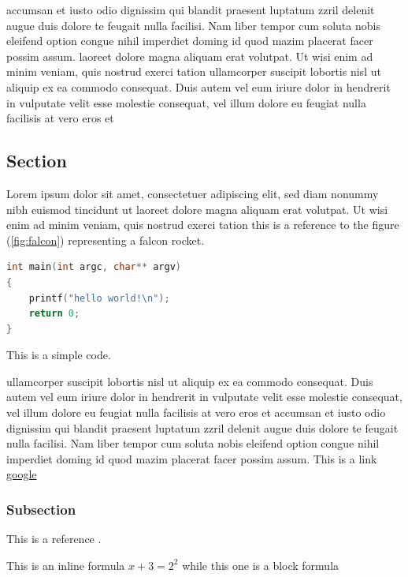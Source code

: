 \documentclass[a4paper, 10pt]{article}
\begin{document}
accumsan et iusto odio dignissim qui blandit praesent luptatum zzril delenit augue duis dolore te feugait nulla facilisi.
Nam liber tempor cum soluta nobis eleifend option congue nihil imperdiet doming id quod mazim placerat facer possim assum.
laoreet dolore magna aliquam erat volutpat. Ut wisi enim ad minim veniam, quis nostrud exerci tation
ullamcorper suscipit lobortis nisl ut aliquip ex ea commodo consequat. Duis autem vel eum iriure dolor in hendrerit in
vulputate velit esse molestie consequat, vel illum dolore eu feugiat nulla facilisis at vero eros et


\subsection{Section}

Lorem ipsum
dolor sit amet, consectetuer adipiscing elit, sed diam nonummy nibh euismod tincidunt ut
laoreet dolore magna aliquam erat volutpat. Ut wisi enim ad minim veniam, quis nostrud exerci tation this is a reference to the figure (\ref{fig:falcon}) representing a falcon rocket.

\begin{program}
\begin{center}

\begin{lstlisting}[language=c]
int main(int argc, char** argv)
{
    printf("hello world!\n");
    return 0;
}
\end{lstlisting}

\caption{This is a simple code.}
\end{center}
\end{program}

ullamcorper suscipit lobortis nisl ut aliquip ex ea commodo consequat. Duis autem vel eum iriure dolor in hendrerit in
vulputate velit esse molestie consequat, vel illum dolore eu feugiat nulla facilisis at vero eros et
accumsan et iusto odio dignissim qui blandit praesent luptatum zzril delenit augue duis dolore te feugait nulla facilisi.
Nam liber tempor cum soluta nobis eleifend option congue nihil imperdiet doming id quod mazim placerat facer possim assum.
This is a link \href{www.google.com"}{google}


\subsubsection{Subsection}

This is a reference \cite{fnref:1}.


This is an inline formula \(x+3 = 2^2\) while this one is a block formula
\end{document}
